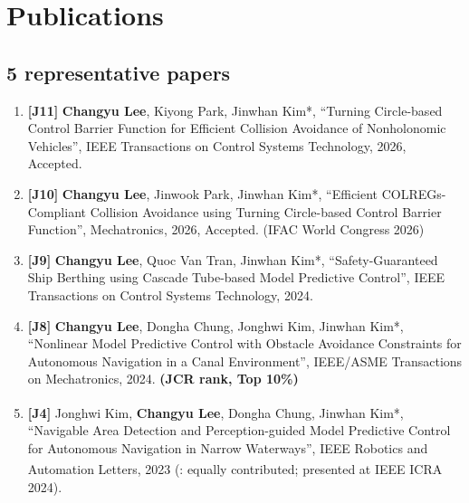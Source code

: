 \documentclass[10pt, letterpaper]{article}
\begin{document}
    
    
    \section{Publications}
           

    \subsection{\textcolor{BrickRed}{5 representative papers}}
        \begin{enumerate}
            \item \textbf{[J11]} \textbf{Changyu Lee}, Kiyong Park, Jinwhan Kim*, “Turning Circle-based Control Barrier Function for Efficient Collision Avoidance of Nonholonomic Vehicles”, \textcolor{BrickRed}{IEEE Transactions on Control Systems Technology}, 2026, Accepted.
            
            \vspace{0.2 cm}

            \item \textbf{[J10]} \textbf{Changyu Lee}, Jinwook Park, Jinwhan Kim*, “Efficient COLREGs-Compliant Collision Avoidance using Turning Circle-based Control Barrier Function”, \textcolor{BrickRed}{Mechatronics}, 2026, Accepted. (IFAC World Congress 2026)
            
            \vspace{0.2 cm}

            \item \textbf{[J9]} \textbf{Changyu Lee}, Quoc Van Tran, Jinwhan Kim*, “Safety-Guaranteed Ship Berthing using Cascade Tube-based Model Predictive Control”, \textcolor{BrickRed}{IEEE Transactions on Control Systems Technology}, 2024.
            
            \vspace{0.2 cm}

            \item \textbf{[J8]} \textbf{Changyu Lee}, Dongha Chung, Jonghwi Kim, Jinwhan Kim*, “Nonlinear Model Predictive Control with Obstacle Avoidance Constraints for Autonomous Navigation in a Canal Environment”, \textcolor{BrickRed}{IEEE/ASME Transactions on Mechatronics}, 2024. \textbf{(JCR rank, Top 10\%)}
            
            \vspace{0.2 cm}

             \item \textbf{[J4]}  Jonghwi Kim\textsuperscript{\textdagger}, \textbf{Changyu Lee}\textsuperscript{\textdagger}, Dongha Chung, Jinwhan Kim*, “Navigable Area Detection and Perception-guided Model Predictive Control for Autonomous Navigation in Narrow Waterways”, \textcolor{BrickRed}{IEEE Robotics and Automation Letters}, 2023 (\textsuperscript{\textdagger}: equally contributed; presented at IEEE ICRA 2024).
            \end{enumerate}
\end{document}
